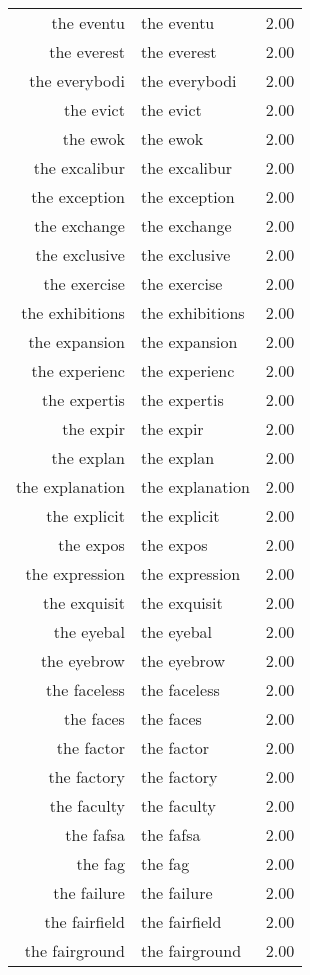 \begin{table}[ht]
\begin{tabular}{rlr}
  the eventu & the eventu & 2.00 \\ 
  the everest & the everest & 2.00 \\ 
  the everybodi & the everybodi & 2.00 \\ 
  the evict & the evict & 2.00 \\ 
  the ewok & the ewok & 2.00 \\ 
  the excalibur & the excalibur & 2.00 \\ 
  the exception & the exception & 2.00 \\ 
  the exchange & the exchange & 2.00 \\ 
  the exclusive & the exclusive & 2.00 \\ 
  the exercise & the exercise & 2.00 \\ 
  the exhibitions & the exhibitions & 2.00 \\ 
  the expansion & the expansion & 2.00 \\ 
  the experienc & the experienc & 2.00 \\ 
  the expertis & the expertis & 2.00 \\ 
  the expir & the expir & 2.00 \\ 
  the explan & the explan & 2.00 \\ 
  the explanation & the explanation & 2.00 \\ 
  the explicit & the explicit & 2.00 \\ 
  the expos & the expos & 2.00 \\ 
  the expression & the expression & 2.00 \\ 
  the exquisit & the exquisit & 2.00 \\ 
  the eyebal & the eyebal & 2.00 \\ 
  the eyebrow & the eyebrow & 2.00 \\ 
  the faceless & the faceless & 2.00 \\ 
  the faces & the faces & 2.00 \\ 
  the factor & the factor & 2.00 \\ 
  the factory & the factory & 2.00 \\ 
  the faculty & the faculty & 2.00 \\ 
  the fafsa & the fafsa & 2.00 \\ 
  the fag & the fag & 2.00 \\ 
  the failure & the failure & 2.00 \\ 
  the fairfield & the fairfield & 2.00 \\ 
  the fairground & the fairground & 2.00 \\ 

\end{tabular}
\end{table}

